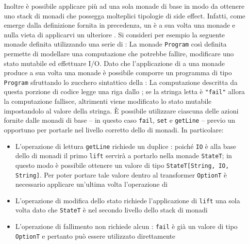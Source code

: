 Inoltre è possibile applicare più  ad una sola monade di base in modo da ottenere uno stack di monadi che possegga molteplici tipologie di side effect. Infatti, come emerge dalla definizione fornita in precedenza, un  è a sua volta una monade e nulla vieta di applicarvi un ulteriore .
Si consideri per esempio la seguente monade definita utilizzando una serie di :
La monade \lstinline{Program} così definita permette di modellare una computazione che potrebbe fallire, modificare uno stato mutabile ed effettuare I/O. Dato che l'applicazione di  a una monade produce a sua volta una monade è possibile comporre un programma di tipo \lstinline{Program} sfruttando lo zucchero sintattico della :
La computazione descritta da questa porzione di codice legge una riga dallo ; se la stringa letta è \lstinline{"fail"} allora la computazione fallisce, altrimenti viene modificato lo stato mutabile impostandolo al valore della stringa.
È possibile utilizzare ciascuna delle azioni fornite dalle monadi di base -- in questo caso \lstinline{fail}, \lstinline{set} e \lstinline{getLine} -- previo un opportuno  per portarle nel livello corretto dello  di monadi. In particolare:
\begin{itemize}
  \item L'operazione di lettura \lstinline{getLine} richiede un duplice : poiché \lstinline{IO} è alla base dello  di monadi il primo \lstinline{lift} servirà a portarlo nella monade \lstinline{StateT}; in questo modo è possibile ottenere un valore di tipo \lstinline{StateT[String, IO, String]}. Per poter portare tale valore dentro al transformer \lstinline{OptionT} è necessario applicare un'ultima volta l'operazione di 
  \item L'operazione di modifica dello stato richiede l'applicazione di \lstinline{lift} una sola volta dato che \lstinline{StateT} è nel secondo livello dello stack di monadi
  \item L'operazione di fallimento non richiede alcun : \lstinline{fail} è già un valore di tipo \lstinline{OptionT} e pertanto può essere utilizzato direttamente
\end{itemize}

